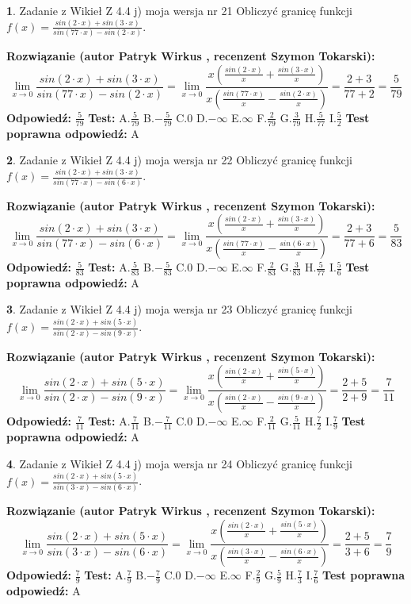 \documentclass[12pt, a4paper]{article}
\theoremstyle{definition} %
\newtheorem{zad}{}
\newcommand{\zadStart}[1]{\begin{zad}#1\newline}
\newcommand{\zadStop}{\end{zad}}
\newcommand{\rozwStart}[2]{\noindent \textbf{Rozwiązanie (autor #1 , recenzent #2): }\newline}
\newcommand{\rozwStop}{\newline}
\newcommand{\odpStart}{\noindent \textbf{Odpowiedź:}\newline}
\newcommand{\odpStop}{\newline}
\newcommand{\testStart}{\noindent \textbf{Test:}\newline}
\newcommand{\testStop}{\newline}
\newcommand{\kluczStart}{\noindent \textbf{Test poprawna odpowiedź:}\newline}
\newcommand{\kluczStop}{\newline}
\begin{document}
\zadStart{Zadanie z Wikieł Z 4.4 j) moja wersja nr 21}
Obliczyć granicę funkcji $f(x)=\frac{sin(2\cdot x) +sin(3\cdot x)}{sin(77\cdot x) -sin(2\cdot x)}$.
\zadStop
\rozwStart{Patryk Wirkus}{Szymon Tokarski}
$$\lim\limits_{x\to 0}\frac{sin(2\cdot x) +sin(3\cdot x)}{sin(77\cdot x) -sin(2\cdot x)}=\lim\limits_{x\to 0}\frac{x(\frac{sin(2\cdot x)}{x}+\frac{sin(3\cdot x)}{x})}{x(\frac{sin(77\cdot x)}{x}-\frac{sin(2\cdot x)}{x})}=\frac{2+3}{77+2} = \frac{5}{79}$$
\rozwStop
\odpStart
$\frac{5}{79}$
\odpStop
\testStart
A.$\frac{5}{79}$
B.$-\frac{5}{79}$
C.$0$
D.$-\infty$
E.$\infty$
F.$\frac{2}{79}$
G.$\frac{3}{79}$
H.$\frac{5}{77}$
I.$\frac{5}{2}$
\testStop
\kluczStart
A
\kluczStop



\zadStart{Zadanie z Wikieł Z 4.4 j) moja wersja nr 22}
Obliczyć granicę funkcji $f(x)=\frac{sin(2\cdot x) +sin(3\cdot x)}{sin(77\cdot x) -sin(6\cdot x)}$.
\zadStop
\rozwStart{Patryk Wirkus}{Szymon Tokarski}
$$\lim\limits_{x\to 0}\frac{sin(2\cdot x) +sin(3\cdot x)}{sin(77\cdot x) -sin(6\cdot x)}=\lim\limits_{x\to 0}\frac{x(\frac{sin(2\cdot x)}{x}+\frac{sin(3\cdot x)}{x})}{x(\frac{sin(77\cdot x)}{x}-\frac{sin(6\cdot x)}{x})}=\frac{2+3}{77+6} = \frac{5}{83}$$
\rozwStop
\odpStart
$\frac{5}{83}$
\odpStop
\testStart
A.$\frac{5}{83}$
B.$-\frac{5}{83}$
C.$0$
D.$-\infty$
E.$\infty$
F.$\frac{2}{83}$
G.$\frac{3}{83}$
H.$\frac{5}{77}$
I.$\frac{5}{6}$
\testStop
\kluczStart
A
\kluczStop



\zadStart{Zadanie z Wikieł Z 4.4 j) moja wersja nr 23}
Obliczyć granicę funkcji $f(x)=\frac{sin(2\cdot x) +sin(5\cdot x)}{sin(2\cdot x) -sin(9\cdot x)}$.
\zadStop
\rozwStart{Patryk Wirkus}{Szymon Tokarski}
$$\lim\limits_{x\to 0}\frac{sin(2\cdot x) +sin(5\cdot x)}{sin(2\cdot x) -sin(9\cdot x)}=\lim\limits_{x\to 0}\frac{x(\frac{sin(2\cdot x)}{x}+\frac{sin(5\cdot x)}{x})}{x(\frac{sin(2\cdot x)}{x}-\frac{sin(9\cdot x)}{x})}=\frac{2+5}{2+9} = \frac{7}{11}$$
\rozwStop
\odpStart
$\frac{7}{11}$
\odpStop
\testStart
A.$\frac{7}{11}$
B.$-\frac{7}{11}$
C.$0$
D.$-\infty$
E.$\infty$
F.$\frac{2}{11}$
G.$\frac{5}{11}$
H.$\frac{7}{2}$
I.$\frac{7}{9}$
\testStop
\kluczStart
A
\kluczStop



\zadStart{Zadanie z Wikieł Z 4.4 j) moja wersja nr 24}
Obliczyć granicę funkcji $f(x)=\frac{sin(2\cdot x) +sin(5\cdot x)}{sin(3\cdot x) -sin(6\cdot x)}$.
\zadStop
\rozwStart{Patryk Wirkus}{Szymon Tokarski}
$$\lim\limits_{x\to 0}\frac{sin(2\cdot x) +sin(5\cdot x)}{sin(3\cdot x) -sin(6\cdot x)}=\lim\limits_{x\to 0}\frac{x(\frac{sin(2\cdot x)}{x}+\frac{sin(5\cdot x)}{x})}{x(\frac{sin(3\cdot x)}{x}-\frac{sin(6\cdot x)}{x})}=\frac{2+5}{3+6} = \frac{7}{9}$$
\rozwStop
\odpStart
$\frac{7}{9}$
\odpStop
\testStart
A.$\frac{7}{9}$
B.$-\frac{7}{9}$
C.$0$
D.$-\infty$
E.$\infty$
F.$\frac{2}{9}$
G.$\frac{5}{9}$
H.$\frac{7}{3}$
I.$\frac{7}{6}$
\testStop
\kluczStart
A
\kluczStop
\end{document}
